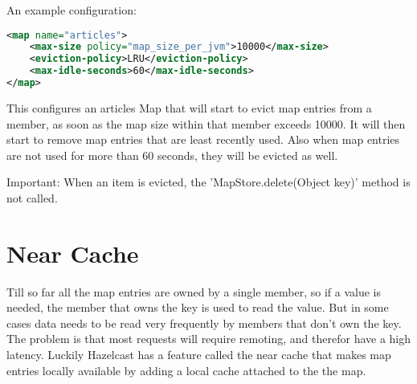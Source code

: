 An example configuration:
\begin{lstlisting}[language=xml]
<map name="articles">
    <max-size policy="map_size_per_jvm">10000</max-size>
    <eviction-policy>LRU</eviction-policy>
    <max-idle-seconds>60</max-idle-seconds>
</map>
\end{lstlisting}
This configures an articles Map that will start to evict map entries from a member, as soon as the map size within that member exceeds 10000. It will then start to remove map entries that are least recently used. Also when map entries are not used for more than 60 seconds, they will be evicted as well.

Important: When an item is evicted, the 'MapStore.delete(Object key)' method is not called.

\section{Near Cache}
Till so far all the map entries are owned by a single member, so if a value is needed, the member that owns the key is used to read the value. But in some cases data needs to be read very frequently by members that don't own the key. The problem is that most requests will require remoting, and therefor have a high latency. Luckily Hazelcast has a feature called the near cache that makes map entries locally available by adding a local cache attached to the the map. 

